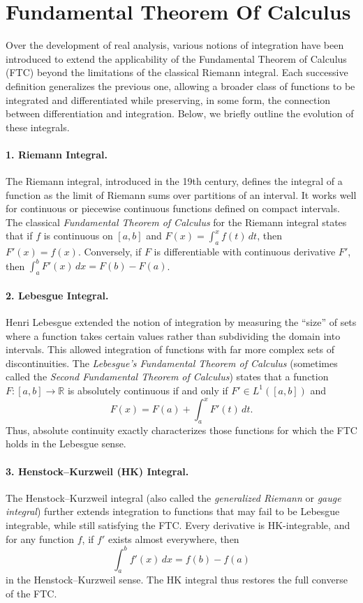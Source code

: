 \documentclass{article}
\numberwithin{equation}{section}
{\theoremstyle{break}\newtheorem{theorem}{Theorem}[subsection]}
{\theoremstyle{break}\theorembodyfont{\rmfamily}\newtheorem{example}[theorem]{Example}}
{\theoremstyle{break}\theorembodyfont{\rmfamily}\newtheorem{definition}[theorem]{Definition}}
{\theoremstyle{break}\theorembodyfont{\rmfamily}\newtheorem{notation}[theorem]{Notation}}
{\theoremstyle{break}\theorembodyfont{\rmfamily}\newtheorem{remark}[theorem]{Remark}}
\begin{document}
{{\section{Fundamental Theorem Of Calculus}

Over the development of real analysis, various notions of integration have been introduced to extend the applicability of the Fundamental Theorem of Calculus (FTC) beyond the limitations of the classical Riemann integral. Each successive definition generalizes the previous one, allowing a broader class of functions to be integrated and differentiated while preserving, in some form, the connection between differentiation and integration. Below, we briefly outline the evolution of these integrals.

\paragraph{1. Riemann Integral.}
The Riemann integral, introduced in the 19th century, defines the integral of a function as the limit of Riemann sums over partitions of an interval. It works well for continuous or piecewise continuous functions defined on compact intervals. The classical \textit{Fundamental Theorem of Calculus} for the Riemann integral states that if \( f \) is continuous on \([a,b]\) and \( F(x) = \int_a^x f(t)\,dt \), then \( F'(x) = f(x) \). Conversely, if \( F \) is differentiable with continuous derivative \( F' \), then \( \int_a^b F'(x)\,dx = F(b) - F(a) \).

\paragraph{2. Lebesgue Integral.}
Henri Lebesgue extended the notion of integration by measuring the ``size'' of sets where a function takes certain values rather than subdividing the domain into intervals. This allowed integration of functions with far more complex sets of discontinuities. The \textit{Lebesgue's Fundamental Theorem of Calculus} (sometimes called the \textit{Second Fundamental Theorem of Calculus}) states that a function \( F:[a,b]\to\mathbb{R} \) is absolutely continuous if and only if \( F' \in L^1([a,b]) \) and
\[
F(x) = F(a) + \int_a^x F'(t)\,dt.
\]
Thus, absolute continuity exactly characterizes those functions for which the FTC holds in the Lebesgue sense.

\paragraph{3. Henstock–Kurzweil (HK) Integral.}
The Henstock–Kurzweil integral (also called the \textit{generalized Riemann} or \textit{gauge integral}) further extends integration to functions that may fail to be Lebesgue integrable, while still satisfying the FTC. Every derivative is HK-integrable, and for any function \( f \), if \( f' \) exists almost everywhere, then
\[
\int_a^b f'(x)\,dx = f(b) - f(a)
\]
in the Henstock–Kurzweil sense. The HK integral thus restores the full converse of the FTC.

}}
\end{document}
